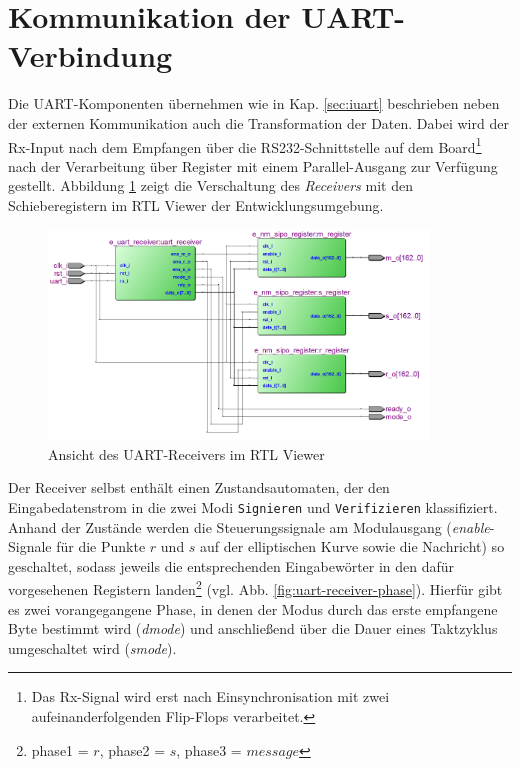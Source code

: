\section{Kommunikation der UART-Verbindung} \label{sec:uartimpl}

Die UART-Komponenten übernehmen wie in Kap. \ref{sec:iuart} beschrieben neben der externen Kommunikation auch die Transformation der Daten. Dabei wird der Rx-Input nach dem Empfangen über die RS232-Schnittstelle auf dem Board\footnote{Das Rx-Signal wird erst nach Einsynchronisation mit zwei aufeinanderfolgenden Flip-Flops verarbeitet.} nach der Verarbeitung über Register mit einem Parallel-Ausgang zur Verfügung gestellt. Abbildung \ref{fig:uartrx} zeigt die Verschaltung des \textit{Receivers} mit den Schieberegistern im RTL Viewer der Entwicklungsumgebung. \\

\begin{figure}[thb]
	\centering
  	\includegraphics[width=0.9\textwidth]{bilder/uart-receiver}
	\caption{Ansicht des UART-Receivers im RTL Viewer}
	\label{fig:uartrx}
\end{figure}

Der Receiver selbst enthält einen Zustandsautomaten, der den Eingabedatenstrom in die zwei Modi \texttt{Signieren} und \texttt{Verifizieren} klassifiziert. Anhand der Zustände werden die Steuerungssignale am Modulausgang (\textit{enable}-Signale für die Punkte $r$ und $s$ auf der elliptischen Kurve sowie die Nachricht) so geschaltet, sodass jeweils die entsprechenden Eingabewörter in den dafür vorgesehenen Registern landen\footnote{phase1 = $r$, phase2 = $s$, phase3 = $message$} (vgl. Abb. \ref{fig:uart-receiver-phase}). Hierfür gibt es zwei vorangegangene Phase, in denen der Modus durch das erste empfangene Byte bestimmt wird (\textit{dmode}) und anschließend über die Dauer eines Taktzyklus umgeschaltet wird (\textit{smode}). \\

